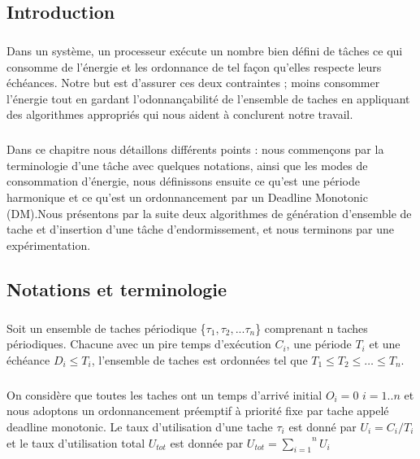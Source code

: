 \documentclass[french]{book}
\begin{document}

\let\cleardoublepage\clearpage
\tableofcontents
\listoffigures  %
\listoftables   %
\chapter{}
\section{Introduction}
\paragraph{}
Dans un système, un processeur exécute un nombre bien défini de tâches ce qui consomme de l’énergie et les ordonnance de tel façon qu'elles respecte leurs échéances.
Notre but est d'assurer ces deux contraintes ; moins consommer l’énergie  tout en gardant l’odonnançabilité de l'ensemble de taches en appliquant des algorithmes appropriés qui nous aident à conclurent notre travail.\paragraph{}
Dans ce chapitre nous détaillons différents points : nous commençons par la terminologie d’une tâche avec quelques notations, ainsi que les modes de consommation d’énergie, nous définissons ensuite ce qu’est une période harmonique et ce qu’est un ordonnancement par un Deadline Monotonic (DM).Nous présentons par la suite deux algorithmes de génération d'ensemble de tache et d’insertion d’une tâche d'endormissement, et nous terminons par une expérimentation.
\section{Notations et terminologie}
\paragraph{}
Soit un ensemble de taches périodique \{$\tau_{1},\tau_{2},. . . \tau_{n}$\} comprenant n taches périodiques. Chacune avec un pire temps d’exécution $C_{i}$, une période $T_{i}$ et une échéance $D_{i} \leq T_{i}$, l’ensemble de taches est ordonnées tel que $T_{1} \leq T_{2} \leq \ldots \leq T_{n}$.\\
\paragraph{}
On considère  que toutes les taches ont un temps d’arrivé initial $O_{i} = 0$ $i=1 .. n$ et nous adoptons un ordonnancement préemptif à priorité fixe par tache appelé deadline monotonic. Le taux d’utilisation d’une tache $ \tau_{i}$ est donné par $ U_{i} = C_{i}/ T_{i}$ et le taux d’utilisation total $ U_{tot} $ est donnée par $U_{tot} = \overset{n}{\underset{i=1}{\sum}} U_{i} $
\end{document}
